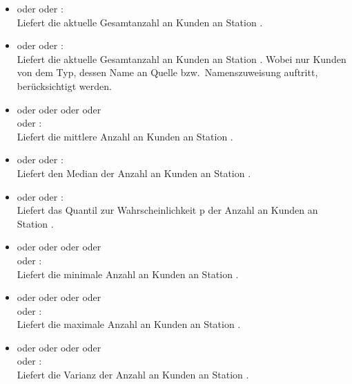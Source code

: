 \begin{itemize}

\item
{} oder  oder :\\
Liefert die aktuelle Gesamtanzahl an Kunden an Station .

\item
{} oder  oder :\\
Liefert die aktuelle Gesamtanzahl an Kunden an Station .
Wobei nur Kunden von dem Typ, dessen Name an Quelle bzw.\ Namenszuweisung  auftritt, berücksichtigt werden.

\item
{} oder  oder  oder  oder\\
 oder :\\
Liefert die mittlere Anzahl an Kunden an Station .

\item
{} oder  oder :\\
Liefert den Median der Anzahl an Kunden an Station .

\item
{} oder  oder :\\
Liefert das Quantil zur Wahrscheinlichkeit p der Anzahl an Kunden an Station .

\item
{} oder  oder  oder  oder\\
 oder :\\
Liefert die minimale Anzahl an Kunden an Station .

\item
{} oder  oder  oder  oder\\
 oder :\\
Liefert die maximale Anzahl an Kunden an Station .

\item
{} oder  oder  oder  oder\\
 oder :\\
Liefert die Varianz der Anzahl an Kunden an Station .


\end{itemize}
